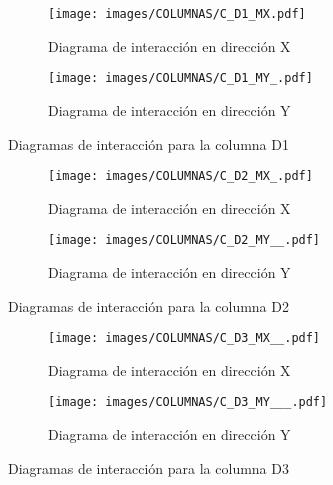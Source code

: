 
\begin{figure}[H]
     \centering
     \begin{subfigure}[b]{0.45\textwidth}
         \centering
         \texttt{[image: images/COLUMNAS/C\_D1\_MX.pdf]}
         \caption{Diagrama de interacción en dirección X}
         \label{fig:CD1 X}
     \end{subfigure}
     \hfill
     \begin{subfigure}[b]{0.45\textwidth}
         \centering
         \texttt{[image: images/COLUMNAS/C\_D1\_MY\_.pdf]}
         \caption{Diagrama de interacción en dirección Y}
         \label{fig:CD1 Y}
     \end{subfigure}
    
        \caption{Diagramas de interacción para la columna D1}
        \label{fig:D1}
\end{figure}


\begin{figure}[H]
     \centering
     \begin{subfigure}[b]{0.45\textwidth}
         \centering
         \texttt{[image: images/COLUMNAS/C\_D2\_MX\_.pdf]}
         \caption{Diagrama de interacción en dirección X}
         \label{fig:CD2 X}
     \end{subfigure}
     \hfill
     \begin{subfigure}[b]{0.45\textwidth}
         \centering
         \texttt{[image: images/COLUMNAS/C\_D2\_MY\_\_.pdf]}
         \caption{Diagrama de interacción en dirección Y}
         \label{fig:CD2 Y}
     \end{subfigure}
    
        \caption{Diagramas de interacción para la columna D2}
        \label{fig:D2}
\end{figure}


\begin{figure}[H]
     \centering
     \begin{subfigure}[b]{0.45\textwidth}
         \centering
         \texttt{[image: images/COLUMNAS/C\_D3\_MX\_\_.pdf]}
         \caption{Diagrama de interacción en dirección X}
         \label{fig:CD3 X}
     \end{subfigure}
     \hfill
     \begin{subfigure}[b]{0.45\textwidth}
         \centering
         \texttt{[image: images/COLUMNAS/C\_D3\_MY\_\_\_.pdf]}
         \caption{Diagrama de interacción en dirección Y}
         \label{fig:CD3 Y}
     \end{subfigure}
    
        \caption{Diagramas de interacción para la columna D3}
        \label{fig:D3}
\end{figure}

